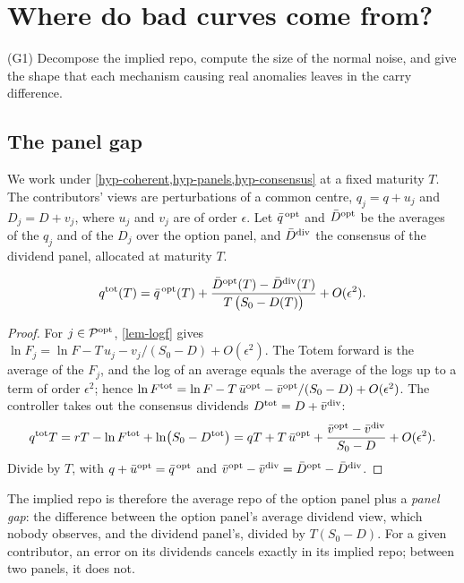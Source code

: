 \section{Where do bad curves come from?}\label{sec-diagnostic}

\begin{objectif}
(G1) Decompose the implied repo, compute the size of the normal noise, and give the shape that each mechanism causing
real anomalies leaves in the carry difference.
\end{objectif}

\subsection{The panel gap}\label{sec-gap}
We work under \cref{hyp-coherent,hyp-panels,hyp-consensus} at a fixed maturity $T$. The contributors' views are
perturbations of a common centre, $q_j=q+u_j$ and $D_j=D+v_j$, where $u_j$ and $v_j$ are of order $\epsilon$. Let
$\bar q^{\,\mathrm{opt}}$ and $\bar D^{\mathrm{opt}}$ be the averages of the $q_j$ and of the $D_j$ over the option panel, and $\bar D^{\mathrm{div}}$ the consensus of
the dividend panel, allocated at maturity $T$.

\begin{proposition}\label{prop-gap}
\begin{equation}\label{eq-gap}
q^{\mathrm{tot}}(T)=\bar q^{\,\mathrm{opt}}(T)+\frac{\bar D^{\mathrm{opt}}(T)-\bar D^{\mathrm{div}}(T)}{T\,\bigl(S_0-D(T)\bigr)}+O(\epsilon^2).
\end{equation}
\end{proposition}
\begin{proof}
For $j\in\mathcal{P}^{\mathrm{opt}}$, \cref{lem-logf} gives $\ln F_j=\ln F-T\,u_j-v_j/(S_0-D)+O(\epsilon^2)$. The Totem forward is the
average of the $F_j$, and the log of an average equals the average of the logs up to a term of order $\epsilon^2$; hence
$\ln F^{\mathrm{tot}}=\ln F-T\,\bar u^{\mathrm{opt}}-\bar v^{\mathrm{opt}}/(S_0-D)+O(\epsilon^2)$. The controller takes out the consensus
dividends $D^{\mathrm{tot}}=D+\bar v^{\mathrm{div}}$:
\[
q^{\mathrm{tot}}T=rT-\ln F^{\mathrm{tot}}+\ln\bigl(S_0-D^{\mathrm{tot}}\bigr)=qT+T\,\bar u^{\mathrm{opt}}+\frac{\bar v^{\mathrm{opt}}-\bar v^{\mathrm{div}}}{S_0-D}
+O(\epsilon^2).
\]
Divide by $T$, with $q+\bar u^{\mathrm{opt}}=\bar q^{\,\mathrm{opt}}$ and $\bar v^{\mathrm{opt}}-\bar v^{\mathrm{div}}=\bar D^{\mathrm{opt}}-\bar D^{\mathrm{div}}$.
\end{proof}

The implied repo is therefore the average repo of the option panel plus a \emph{panel gap}: the difference between the
option panel's average dividend view, which nobody observes, and the dividend panel's, divided by $T(S_0-D)$. For a
given contributor, an error on its dividends cancels exactly in its implied repo; between two panels, it does not.

